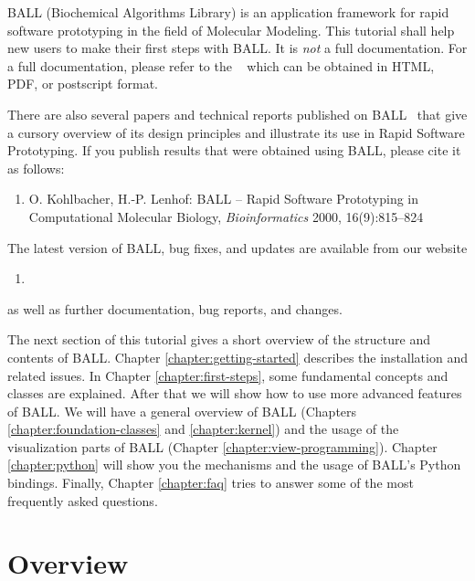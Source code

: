 \noindent
BALL (Biochemical Algorithms Library) is an application framework for rapid
software prototyping in the field of Molecular Modeling.  This tutorial shall
help new users to make their first steps with BALL. It is {\em not} a full
documentation. For a full documentation, please refer to the ~\cite{BALL-RM} which can be obtained in HTML, PDF, or postscript format.

There are also several papers and technical reports published on
BALL~\cite{BKL99a,BKL99b,KL99,Koh2001,KL2000,MHLK05,MHLK06}
that give a cursory overview of its design principles and illustrate its use in
Rapid Software Prototyping. If you publish results that were obtained using 
BALL, please cite it as follows:
\begin{enumerate}
  \item[] O. Kohlbacher, H.-P. Lenhof: BALL -- Rapid Software Prototyping
          in Computational Molecular Biology, {\em Bioinformatics} 2000,
          16(9):815--824
\end{enumerate}

\noindent
The latest version of BALL, bug fixes, and updates are available from our 
website

\begin{enumerate}
  \item[] 
\end{enumerate}

\noindent 
as well as further documentation, bug reports, and changes.

The next section of this tutorial gives a short overview of the structure and
contents of BALL. Chapter \ref{chapter:getting-started} describes the
installation and related issues. In Chapter \ref{chapter:first-steps}, some
fundamental concepts and classes are explained. After that we will show how to
use more advanced features of BALL. We will have a general overview of BALL 
 (Chapters \ref{chapter:foundation-classes} and  \ref{chapter:kernel}) 
and the usage of the visualization parts of BALL (Chapter \ref{chapter:view-programming}). 
Chapter \ref{chapter:python} will show you
the mechanisms and the usage of BALL's Python bindings.  Finally, Chapter
\ref{chapter:faq} tries to answer some of the most frequently asked questions.

\section{Overview}

